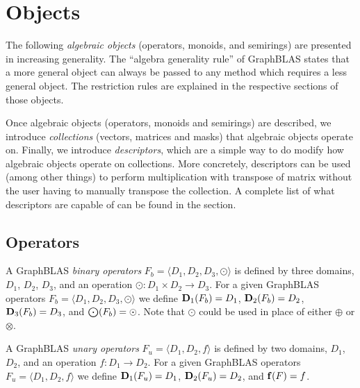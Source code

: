 \chapter{Objects}

The following \emph{algebraic objects} (operators, monoids, and semirings) are presented in increasing generality.
The ``algebra generality rule'' of GraphBLAS states that a more general object can always be passed to
any method which requires a less general object. The restriction rules are explained in the respective sections of those objects.

Once algebraic objects (operators, monoids and semirings) are described, we introduce \emph{collections} (vectors, matrices and masks) that algebraic objects operate on. Finally, we introduce \emph{descriptors}, which are a simple way to do modify how algebraic objects operate on collections. More concretely, descriptors can be used (among other things) to perform multiplication with transpose of matrix without the user having to manually transpose the collection. A complete list of what descriptors are capable of can be found in the section.

\section{Operators}

A GraphBLAS \emph{binary operators} $F_b = \langle D_1, D_2, D_3, \odot \rangle$
is defined by three domains, $D_1$, $D_2$, $D_3$, and an operation
$\odot: D_1 \times D_2 \rightarrow D_3$.  For a given GraphBLAS operators
$F_b=\langle D_1, D_2, D_3,\odot \rangle$ we define $\bold{D}_1(F_b) = D_1$,
$\bold{D}_2(F_b) = D_2$, $\bold{D}_3(F_b) = D_3$, and $\bold{\bigodot}(F_b)
= \odot$.  Note that $\odot$ could be used in place of either $\oplus$ or $\otimes$.

A GraphBLAS \emph{unary operators} $F_u = \langle D_1, D_2, f\rangle$
is defined by two domains, $D_1$, $D_2$, and an operation
$f: D_1 \rightarrow D_2$.  For a given GraphBLAS operators
$F_u=\langle D_1, D_2, f \rangle$ we define $\bold{D}_1(F_u) = D_1$,
$\bold{D}_2(F_u) = D_2$, and $\bold{f}(F)
= f$.

